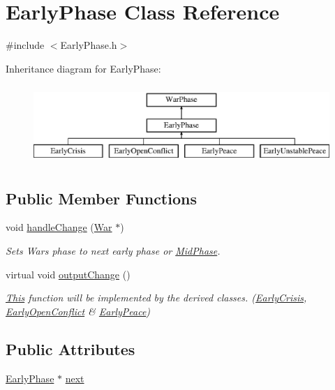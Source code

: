 \hypertarget{class_early_phase}{}\section{Early\+Phase Class Reference}
\label{class_early_phase}


{\ttfamily \#include $<$Early\+Phase.\+h$>$}

Inheritance diagram for Early\+Phase\+:\begin{figure}[H]
\begin{center}
\leavevmode
\includegraphics[height=3.000000cm]{class_early_phase}
\end{center}
\end{figure}
\subsection*{Public Member Functions}
\begin{DoxyCompactItemize}
\item 
void \mbox{\hyperlink{class_early_phase_a2f5485add7def09e0ec0538c552c88d8}{handle\+Change}} (\mbox{\hyperlink{class_war}{War}} $\ast$)
\begin{DoxyCompactList}\small\item\em Sets Wars phase to next early phase or \mbox{\hyperlink{class_mid_phase}{Mid\+Phase}}. \end{DoxyCompactList}\item 
virtual void \mbox{\hyperlink{class_early_phase_a4dec6915b8c177199bc2b92a49fdb3af}{output\+Change}} ()
\begin{DoxyCompactList}\small\item\em \mbox{\hyperlink{class_this}{This}} function will be implemented by the derived classes. (\mbox{\hyperlink{class_early_crisis}{Early\+Crisis}}, \mbox{\hyperlink{class_early_open_conflict}{Early\+Open\+Conflict}} \& \mbox{\hyperlink{class_early_peace}{Early\+Peace}}) \end{DoxyCompactList}\end{DoxyCompactItemize}
\subsection*{Public Attributes}
\begin{DoxyCompactItemize}
\item 
\mbox{\hyperlink{class_early_phase}{Early\+Phase}} $\ast$ \mbox{\hyperlink{class_early_phase_a972cc28503787c749cad7b611204c951}{next}}
\end{DoxyCompactItemize}


